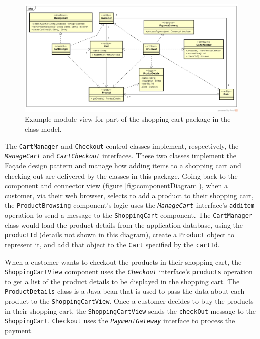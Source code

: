 \begin{figure}[h]
    \centering
    \begin{adjustwidth}{-9mm}{-10mm}
        \includegraphics[trim=24 51 23 43,clip,width=0.97\paperwidth]{images/shopping_cart_class_diagram.png}
    \end{adjustwidth}
    \caption{Example module view for part of the shopping cart package in the class model.}
    \label{fig:classDiagram}
\end{figure}

\noindent
The \texttt{CartManager} and \texttt{Checkout} control classes implement, respectively, the \texttt{\textsl{ManageCart}} and \texttt{\textsl{Cart\-Checkout}} interfaces.
These two classes implement the Façade design pattern and manage how adding items to a shopping cart and checking out are delivered by the classes in this package.
Going back to the component and connector view (figure \ref{fig:componentDiagram}),
when a customer, via their web browser, selects to add a product to their shopping cart,
the \texttt{ProductBrowsing} component's logic uses the \texttt{\textsl{ManageCart}} interface's \texttt{additem} operation to send a message to the \texttt{ShoppingCart} component.
The \texttt{CartManager} class would load the product details from the application database, using the \texttt{productId} (details not shown in this diagram),
create a \texttt{Product} object to represent it, and add that object to the \texttt{Cart} specified by the \texttt{cartId}.

When a customer wants to checkout the products in their shopping cart, the \texttt{ShoppingCartView} component
uses the \texttt{\textsl{Checkout}} interface's \texttt{products} operation to get a list of the product details to be displayed in the shopping cart.
The \texttt{ProductDetails} class is a Java bean that is used to pass the data about each product to the \texttt{ShoppingCartView}.
Once a customer decides to buy the products in their shopping cart, the \texttt{ShoppingCartView} sends the \texttt{checkOut} message to the \texttt{ShoppingCart}.
\texttt{Checkout} uses the \texttt{\textsl{PaymentGateway}} interface to process the payment.

